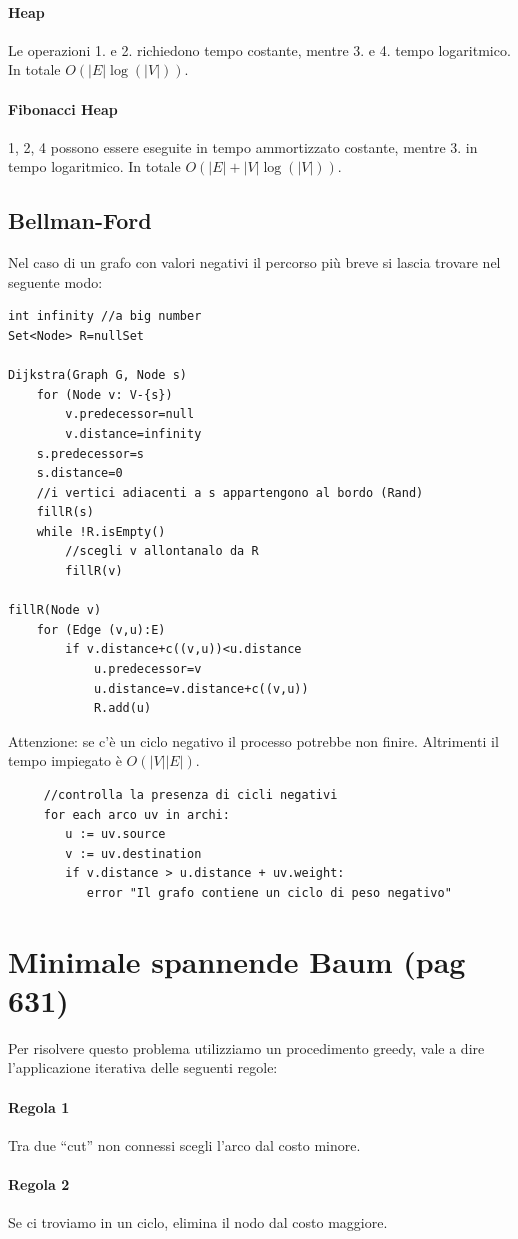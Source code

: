 \documentclass[a4paper]{book}
\begin{document}
\paragraph*{Heap}
Le operazioni 1. e 2. richiedono tempo costante, mentre 3. e 4. tempo logaritmico. In totale $O(|E|\log (|V|))$.
\paragraph*{Fibonacci Heap}
1, 2, 4 possono essere eseguite in tempo ammortizzato costante, mentre 3. in tempo logaritmico. In totale $O(|E|+|V|\log (|V|))$.
\subsection*{Bellman-Ford}
Nel caso di un grafo con valori negativi il percorso più breve si lascia trovare nel seguente modo:
\begin{lstlisting}
int infinity //a big number
Set<Node> R=nullSet
	
Dijkstra(Graph G, Node s)
	for (Node v: V-{s})
		v.predecessor=null
		v.distance=infinity
	s.predecessor=s
	s.distance=0
	//i vertici adiacenti a s appartengono al bordo (Rand)
	fillR(s)
	while !R.isEmpty()
		//scegli v allontanalo da R
		fillR(v)
		
fillR(Node v)
	for (Edge (v,u):E)
		if v.distance+c((v,u))<u.distance
			u.predecessor=v
			u.distance=v.distance+c((v,u))
			R.add(u)				
\end{lstlisting}
Attenzione: se c'è un ciclo negativo il processo potrebbe non finire. Altrimenti il tempo impiegato è $O(|V||E|)$.
\begin{lstlisting}
     //controlla la presenza di cicli negativi
     for each arco uv in archi:
        u := uv.source
        v := uv.destination
        if v.distance > u.distance + uv.weight:
           error "Il grafo contiene un ciclo di peso negativo"
\end{lstlisting}
\section{Minimale spannende Baum (pag 631)}
Per risolvere questo problema utilizziamo un procedimento greedy, vale a dire l'applicazione iterativa delle seguenti regole:
\paragraph*{Regola 1} Tra due ``cut'' non connessi scegli l'arco dal costo minore.
\paragraph*{Regola 2} Se ci troviamo in un ciclo, elimina il nodo dal costo maggiore.
\end{document}
